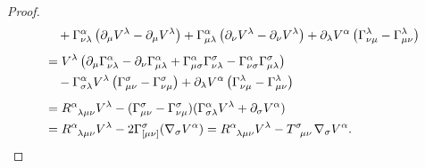 \documentclass[11pt]{article}
\begin{document}
\begin{proof}
\begin{equation*}
\begin{aligned}
                               &\quad + \Gamma_{\nu\lambda}^{\alpha}\left( \partial_{\mu}V^{\lambda} - \partial_{\mu}V^{\lambda} \right) + \Gamma_{\mu\lambda}^{\alpha}\left( \partial_{\nu}V^{\lambda} - \partial_{\nu}V^{\lambda} \right) + \partial_{\lambda}V^{\alpha}\left( \Gamma_{\nu\mu}^{\lambda} - \Gamma_{\mu\nu}^{\lambda} \right) \\[1ex]
                               &= V^{\lambda}\left( \partial_{\mu}\Gamma_{\nu\lambda}^{\alpha} - \partial_{\nu}\Gamma_{\mu\lambda}^{\alpha} + \Gamma_{\mu\sigma}^{\alpha}\Gamma_{\nu\lambda}^{\sigma} - \Gamma_{\nu\sigma}^{\alpha}\Gamma_{\mu\lambda}^{\sigma} \right) \\
                               &\quad - \Gamma_{\sigma\lambda}^{\alpha}V^{\lambda}\left( \Gamma_{\mu\nu}^{\sigma} - \Gamma_{\nu\mu}^{\sigma} \right) + \partial_{\lambda}V^{\alpha}\left( \Gamma_{\nu\mu}^{\lambda} - \Gamma_{\mu\nu}^{\lambda} \right)\\[1ex]
                               &= \tensor{R}{^{\alpha}_{\lambda\mu\nu}} V^{\lambda} - (\Gamma_{\mu\nu}^{\sigma} - \Gamma_{\nu\mu}^{\sigma})(\Gamma_{\sigma\lambda}^{\alpha} V^{\lambda} + \partial_{\sigma} V^{\alpha}) \\
      &= \tensor{R}{^{\alpha}_{\lambda\mu\nu}} V^{\lambda} - 2\Gamma_{[\mu\nu]}^{\sigma}(\nabla_{\sigma}V^{\alpha}) = \tensor{R}{^{\alpha}_{\lambda\mu\nu} }V^{\lambda} - \tensor{T}{^{\sigma}_{\mu\nu} }\nabla_{\sigma}V^{\alpha}.
		\end{aligned}
	\end{equation*}
\end{proof}
\end{document}
